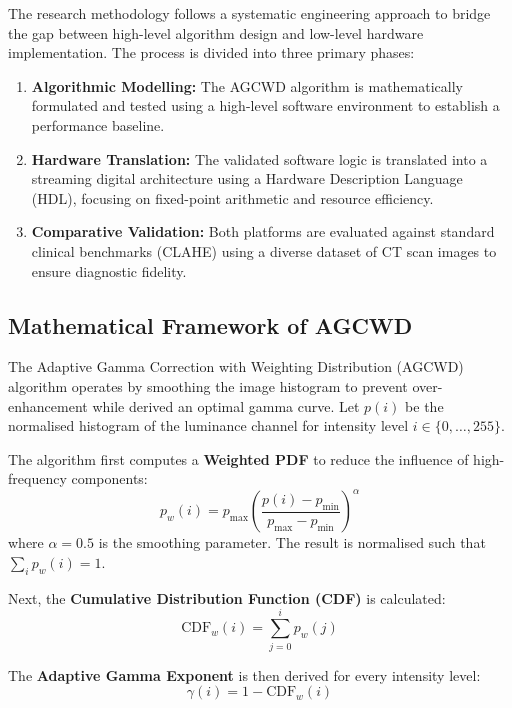 \documentclass[conference]{IEEEtran}
\begin{document}
The research methodology follows a systematic engineering approach to bridge the gap between high-level algorithm design and low-level hardware implementation. The process is divided into three primary phases:
\begin{enumerate}
    \item \textbf{Algorithmic Modelling:} The AGCWD algorithm is mathematically formulated and tested using a high-level software environment to establish a performance baseline.
    \item \textbf{Hardware Translation:} The validated software logic is translated into a streaming digital architecture using a Hardware Description Language (HDL), focusing on fixed-point arithmetic and resource efficiency.
    \item \textbf{Comparative Validation:} Both platforms are evaluated against standard clinical benchmarks (CLAHE) using a diverse dataset of CT scan images to ensure diagnostic fidelity.
\end{enumerate}

\subsection{Mathematical Framework of AGCWD}

The Adaptive Gamma Correction with Weighting Distribution (AGCWD) algorithm operates by smoothing the image histogram to prevent over-enhancement while derived an optimal gamma curve. Let $p(i)$ be the normalised histogram of the luminance channel for intensity level $i \in \{0, \ldots, 255\}$.

The algorithm first computes a \textbf{Weighted PDF} to reduce the influence of high-frequency components:
\begin{equation}
  p_w(i) = p_{\max} \left(\frac{p(i) - p_{\min}}{p_{\max} - p_{\min}}\right)^{\alpha}
  \label{eq:wpdf}
\end{equation}
where $\alpha = 0.5$ is the smoothing parameter. The result is normalised such that $\sum_i p_w(i) = 1$.

Next, the \textbf{Cumulative Distribution Function (CDF)} is calculated:
\begin{equation}
  \text{CDF}_w(i) = \sum_{j=0}^{i} p_w(j)
  \label{eq:cdf}
\end{equation}

The \textbf{Adaptive Gamma Exponent} is then derived for every intensity level:
\begin{equation}
  \gamma(i) = 1 - \text{CDF}_w(i)
  \label{eq:gamma}
\end{equation}
\end{document}
